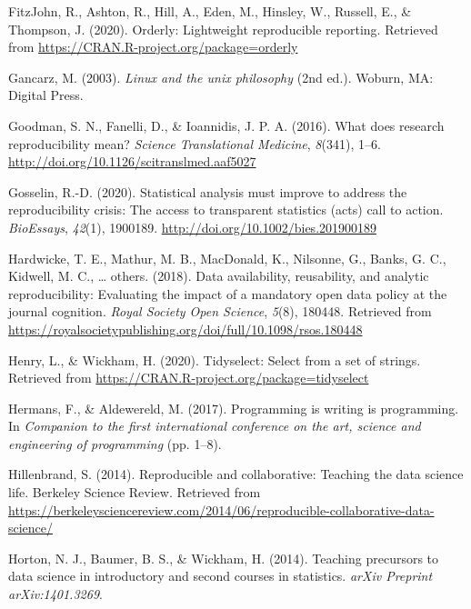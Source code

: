 \documentclass[12pt,twoside]{reedthesis}
\begin{document}
\leavevmode\hypertarget{ref-R-orderly}{}%
FitzJohn, R., Ashton, R., Hill, A., Eden, M., Hinsley, W., Russell, E., \& Thompson, J. (2020). Orderly: Lightweight reproducible reporting. Retrieved from \url{https://CRAN.R-project.org/package=orderly}

\leavevmode\hypertarget{ref-unix}{}%
Gancarz, M. (2003). \emph{Linux and the unix philosophy} (2nd ed.). Woburn, MA: Digital Press.

\leavevmode\hypertarget{ref-Goodman341ps12}{}%
Goodman, S. N., Fanelli, D., \& Ioannidis, J. P. A. (2016). What does research reproducibility mean? \emph{Science Translational Medicine}, \emph{8}(341), 1--6. \url{http://doi.org/10.1126/scitranslmed.aaf5027}

\leavevmode\hypertarget{ref-bioessays-gosselin}{}%
Gosselin, R.-D. (2020). Statistical analysis must improve to address the reproducibility crisis: The access to transparent statistics (acts) call to action. \emph{BioEssays}, \emph{42}(1), 1900189. \url{http://doi.org/10.1002/bies.201900189}

\leavevmode\hypertarget{ref-hardwicke2018data}{}%
Hardwicke, T. E., Mathur, M. B., MacDonald, K., Nilsonne, G., Banks, G. C., Kidwell, M. C., \ldots{} others. (2018). Data availability, reusability, and analytic reproducibility: Evaluating the impact of a mandatory open data policy at the journal cognition. \emph{Royal Society Open Science}, \emph{5}(8), 180448. Retrieved from \url{https://royalsocietypublishing.org/doi/full/10.1098/rsos.180448}

\leavevmode\hypertarget{ref-R-tidyselect}{}%
Henry, L., \& Wickham, H. (2020). Tidyselect: Select from a set of strings. Retrieved from \url{https://CRAN.R-project.org/package=tidyselect}

\leavevmode\hypertarget{ref-hermans2017programming}{}%
Hermans, F., \& Aldewereld, M. (2017). Programming is writing is programming. In \emph{Companion to the first international conference on the art, science and engineering of programming} (pp. 1--8).

\leavevmode\hypertarget{ref-berkeley_teaching}{}%
Hillenbrand, S. (2014). Reproducible and collaborative: Teaching the data science life. Berkeley Science Review. Retrieved from \url{https://berkeleysciencereview.com/2014/06/reproducible-collaborative-data-science/}

\leavevmode\hypertarget{ref-horton2014teaching}{}%
Horton, N. J., Baumer, B. S., \& Wickham, H. (2014). Teaching precursors to data science in introductory and second courses in statistics. \emph{arXiv Preprint arXiv:1401.3269}.
\end{document}
